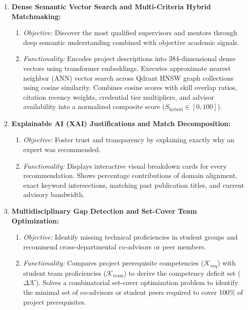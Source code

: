 \begin{enumerate}[label=\textbf{\arabic*.}]
    \item \textbf{Dense Semantic Vector Search and Multi-Criteria Hybrid Matchmaking:}
    \begin{enumerate}[label=(\alph*)]
        \item \textit{Objective:} Discover the most qualified supervisors and mentors through deep semantic understanding combined with objective academic signals.
        \item \textit{Functionality:} Encodes project descriptions into 384-dimensional dense vectors using transformer embeddings. Executes approximate nearest neighbor (ANN) vector search across Qdrant HNSW graph collections using cosine similarity. Combines cosine scores with skill overlap ratios, citation recency weights, credential tier multipliers, and advisor availability into a normalized composite score ($S_{\text{hybrid}} \in [0, 100]$).
    \end{enumerate}

    \item \textbf{Explainable AI (XAI) Justifications and Match Decomposition:}
    \begin{enumerate}[label=(\alph*)]
        \item \textit{Objective:} Foster trust and transparency by explaining exactly why an expert was recommended.
        \item \textit{Functionality:} Displays interactive visual breakdown cards for every recommendation. Shows percentage contributions of domain alignment, exact keyword intersections, matching past publication titles, and current advisory bandwidth.
    \end{enumerate}

    \item \textbf{Multidisciplinary Gap Detection and Set-Cover Team Optimization:}
    \begin{enumerate}[label=(\alph*)]
        \item \textit{Objective:} Identify missing technical proficiencies in student groups and recommend cross-departmental co-advisors or peer members.
        \item \textit{Functionality:} Compares project prerequisite competencies ($\mathcal{K}_{\text{req}}$) with student team proficiencies ($\mathcal{K}_{\text{team}}$) to derive the competency deficit set ($\Delta \mathcal{K}$). Solves a combinatorial set-cover optimization problem to identify the minimal set of co-advisors or student peers required to cover 100\% of project prerequisites.
    \end{enumerate}


\end{enumerate}
